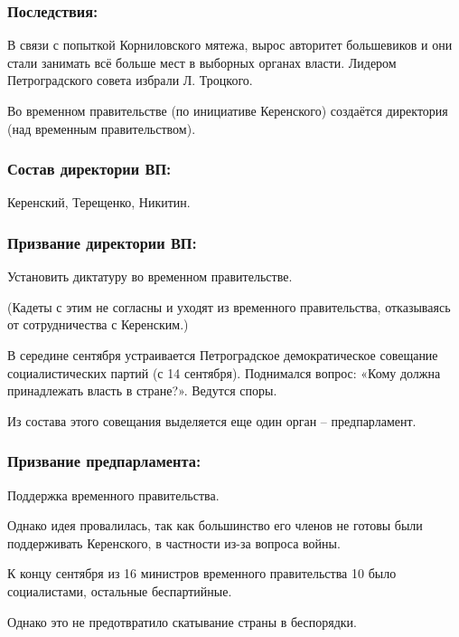 \subsubsection{\textbf{Последствия:}}

В связи с попыткой Корниловского мятежа, вырос авторитет большевиков и они стали занимать всё больше мест в выборных органах власти. Лидером Петроградского совета избрали Л. Троцкого.

Во временном правительстве (по инициативе Керенского) создаётся директория (над временным правительством).

\subsubsection{\textbf{Состав директории ВП:}}

Керенский, Терещенко, Никитин.

\subsubsection{\textbf{Призвание директории ВП:}}

Установить диктатуру во временном правительстве.

(Кадеты с этим не согласны и уходят из временного правительства, отказываясь от сотрудничества с Керенским.)

В середине сентября устраивается Петроградское демократическое совещание социалистических партий (с 14 сентября). Поднимался вопрос: «Кому должна принадлежать власть в стране?». Ведутся споры.

Из состава этого совещания выделяется еще один орган – предпарламент.

\subsubsection{\textbf{Призвание предпарламента:}}
 
Поддержка временного правительства.

Однако идея провалилась, так как большинство его членов не готовы были поддерживать Керенского, в частности из-за вопроса войны.

К концу сентября из 16 министров временного правительства 10 было социалистами, остальные беспартийные.

Однако это не предотвратило скатывание страны в беспорядки.